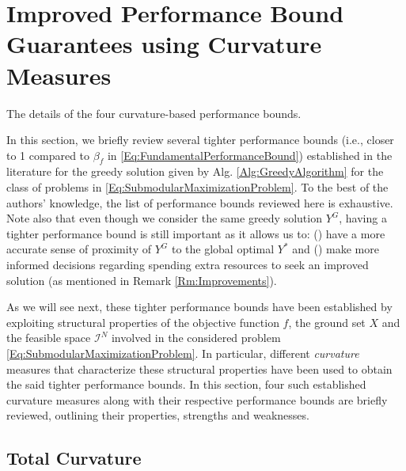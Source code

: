 \documentclass[letterpaper, 10 pt, conference]{ieeeconf}
\begin{document}
{\color{red}

\section{Improved Performance Bound Guarantees using Curvature Measures}
\label{Sec:CurvatureMeasures}

{\color{blue} The details of the four curvature-based performance bounds. }

In this section, we briefly review several tighter performance bounds (i.e., closer to 1 compared to $\beta_f$ in \eqref{Eq:FundamentalPerformanceBound}) established in the literature for the greedy solution given by Alg. \ref{Alg:GreedyAlgorithm} for the class of problems in \eqref{Eq:SubmodularMaximizationProblem}. To the best of the authors' knowledge, the list of performance bounds reviewed here is exhaustive. Note also that even though we consider the same greedy solution $Y^G$, having a tighter performance bound is still important as it allows us to: () have a more accurate sense of proximity of $Y^G$ to the global optimal $Y^*$ and () make more informed decisions regarding spending extra resources to seek an improved solution (as mentioned in Remark \ref{Rm:Improvements}). 


As we will see next, these tighter performance bounds have been established by exploiting structural properties of the objective function $f$, the ground set $X$ and the feasible space $\mathcal{I}^N$ involved in the considered problem \eqref{Eq:SubmodularMaximizationProblem}. In particular, different \emph{curvature} measures that characterize these structural properties have been used to obtain the said tighter performance bounds. In this section, four such established curvature measures along with their respective performance bounds are briefly reviewed, outlining their properties, strengths and weaknesses. 


\subsection{Total Curvature \cite{Conforti1984}}
\label{SubSec:TotalCurvature}

}
\end{document}
